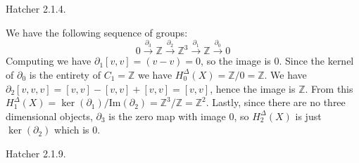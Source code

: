 \documentclass{article}                                                        %
\begin{document}
    \begin{problem}
        Hatcher 2.1.4.
    \end{problem}
    \begin{solution}
        We have the following sequence of groups:
        \begin{equation*}
            0\overset{\partial_{3}}{\longrightarrow}\mathbb{Z}
            \overset{\partial_{2}}{\longrightarrow}\mathbb{Z}^{3}
            \overset{\partial_{1}}{\longrightarrow}\mathbb{Z}
            \overset{\partial_{0}}{\longrightarrow}{0}
        \end{equation*}
        Computing we have $\partial_{1}[v,v]=(v-v)=0$, so the image is $0$.
        Since the kernel of $\partial_{0}$ is the entirety of $C_{1}=\mathbb{Z}$
        we have $H_{0}^{\Delta}(X)=\mathbb{Z}/0=\mathbb{Z}$. We have
        $\partial_{2}[v,v,v]=[v,v]-[v,v]+[v,v]=[v,v]$, hence the image is
        $\mathbb{Z}$. From this
        $H_{1}^{\Delta}(X)=\ker(\partial_{1})/\textrm{Im}(\partial_{2})=\mathbb{Z}^{3}/\mathbb{Z}=\mathbb{Z}^{2}$.
        Lastly, since there are no three dimensional objects, $\partial_{3}$ is the
        zero map with image $0$, so $H_{2}^{\Delta}(X)$ is just $\ker(\partial_{2})$ which is 0.
    \end{solution}
    \begin{problem}
        Hatcher 2.1.9.
    \end{problem}
\end{document}
